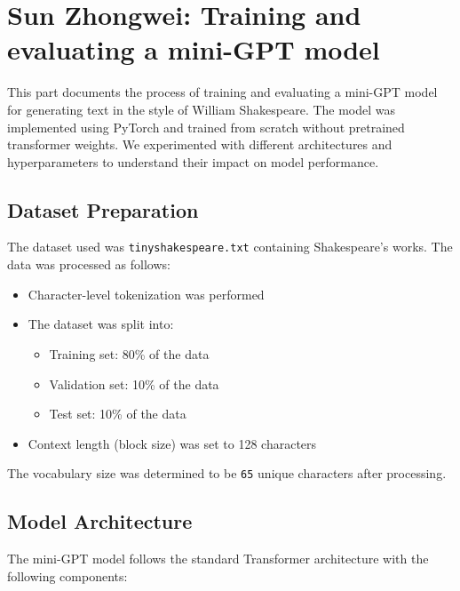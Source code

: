 \section{Sun Zhongwei: Training and evaluating a mini-GPT model}

This part documents the process of training and evaluating a mini-GPT model for generating text in the style of William Shakespeare. The model was implemented using PyTorch and trained from scratch without pretrained transformer weights. We experimented with different architectures and hyperparameters to understand their impact on model performance.

\begin{center}
\end{center}

\subsection{Dataset Preparation}
The dataset used was \texttt{tinyshakespeare.txt} containing Shakespeare's works. The data was processed as follows:

\begin{itemize}
    \item Character-level tokenization was performed
    \item The dataset was split into:
    \begin{itemize}
        \item Training set: 80\% of the data
        \item Validation set: 10\% of the data
        \item Test set: 10\% of the data
    \end{itemize}
    \item Context length (block size) was set to 128 characters
\end{itemize}

The vocabulary size was determined to be \texttt{65} unique characters after processing.

\subsection{Model Architecture}
The mini-GPT model follows the standard Transformer architecture with the following components:

